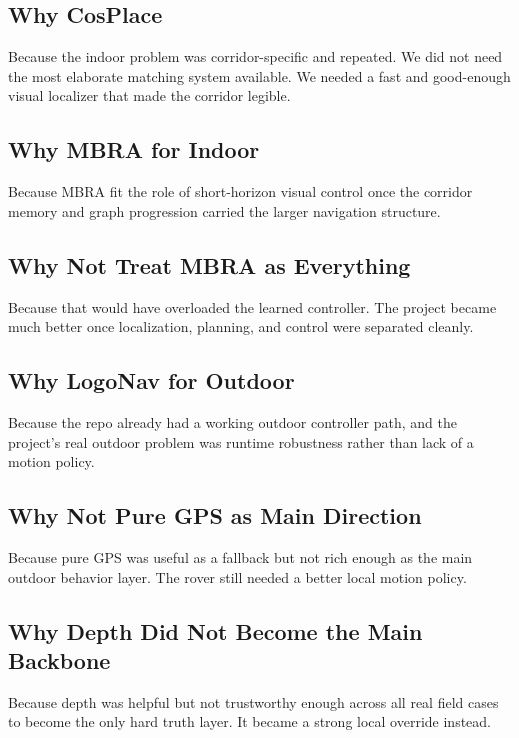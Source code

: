 \documentclass[11pt]{article}
\begin{document}
\subsection{Why CosPlace}

Because the indoor problem was corridor-specific and repeated. We did not need the
most elaborate matching system available. We needed a fast and good-enough visual
localizer that made the corridor legible.

\subsection{Why MBRA for Indoor}

Because MBRA fit the role of short-horizon visual control once the corridor memory
and graph progression carried the larger navigation structure.

\subsection{Why Not Treat MBRA as Everything}

Because that would have overloaded the learned controller. The project became much
better once localization, planning, and control were separated cleanly.

\subsection{Why LogoNav for Outdoor}

Because the repo already had a working outdoor controller path, and the project’s
real outdoor problem was runtime robustness rather than lack of a motion policy.

\subsection{Why Not Pure GPS as Main Direction}

Because pure GPS was useful as a fallback but not rich enough as the main outdoor
behavior layer. The rover still needed a better local motion policy.

\subsection{Why Depth Did Not Become the Main Backbone}

Because depth was helpful but not trustworthy enough across all real field cases to
become the only hard truth layer. It became a strong local override instead.
\end{document}
